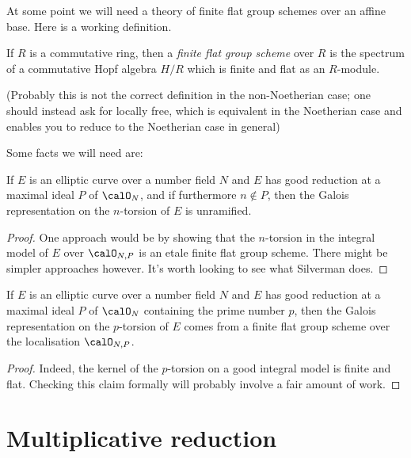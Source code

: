 At some point we will need a theory of finite flat group schemes over an affine base. Here
is a working definition.

\begin{definition}\label{finite_flat_group_scheme} If $R$ is a commutative ring, then
  a \emph{finite flat group scheme} over $R$ is the spectrum of a commutative Hopf algebra $H/R$ 
  which is finite and flat as an $R$-module.
\end{definition}

(Probably this is not the correct definition in the non-Noetherian case; one should instead ask for locally free, which is equivalent in the Noetherian case and enables you to reduce to the Noetherian case in general)

Some facts we will need are:

\begin{theorem}\label{good_reduction_implies_unramified}\notready If $E$ is an elliptic curve over a number 
  field $N$ and $E$ has good reduction at a maximal ideal $P$ of $\calO_N$, and if furthermore 
  $n\not\in P$, then the Galois representation on the $n$-torsion of $E$ is unramified.
\end{theorem}
\begin{proof}
  One approach would be by showing that the $n$-torsion in the integral model of $E$ over $\calO_{N,P}$
  is an etale finite flat group scheme. There might be simpler approaches however. It's worth looking to see what Silverman does.
\end{proof}

\begin{theorem}\label{good_reduction_implies_flat}\notready If $E$ is an elliptic curve over a number field 
  $N$ and $E$ has good reduction at a maximal ideal $P$ of $\calO_N$ containing the prime number $p$, 
  then the Galois representation on the $p$-torsion of $E$ comes from a finite flat group scheme 
  over the localisation $\calO_{N,P}$.
\end{theorem}
\begin{proof}
  Indeed, the kernel of the $p$-torsion on a good integral model is finite and flat.
  Checking this claim formally will probably involve a fair amount of work.
\end{proof}

\section{Multiplicative reduction}

